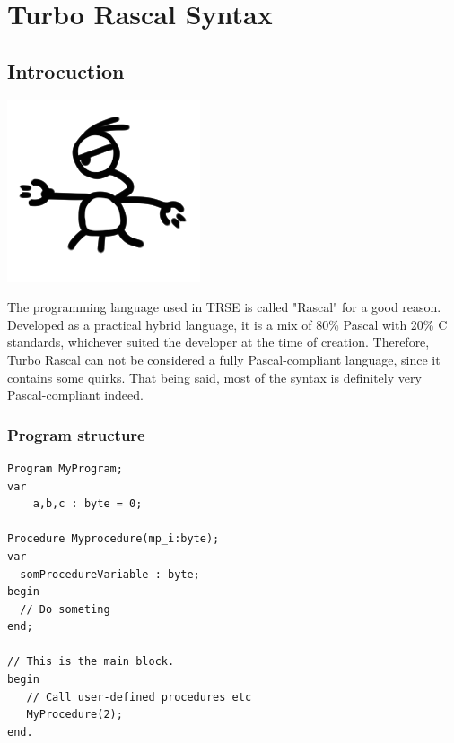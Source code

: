 \setchapterpreamble[u]{\margintoc}
\chapter{Turbo Rascal Syntax}

\section{Introcuction}

\begin{minipage}{0.2\textwidth}
\includegraphics[width=\linewidth]{images/trip/trip2.png}
\end{minipage}
\begin{minipage}{0.8\textwidth}\raggedleft
The programming language used in TRSE is called "Rascal" for a good reason. Developed as a practical hybrid language, it is a mix of 80\% Pascal with 20\% C standards, whichever suited the developer at the time of creation. Therefore, Turbo Rascal can not be considered a fully Pascal-compliant language, since it contains some quirks. That being said, most of the syntax is definitely very Pascal-compliant indeed.   
\end{minipage}
\subsection{Program structure}
\begin{lstlisting}
Program MyProgram;
var
    a,b,c : byte = 0;
 
Procedure Myprocedure(mp_i:byte);
var
  somProcedureVariable : byte;
begin
  // Do someting
end;
 
// This is the main block.
begin
   // Call user-defined procedures etc
   MyProcedure(2);
end.
\end{lstlisting}
